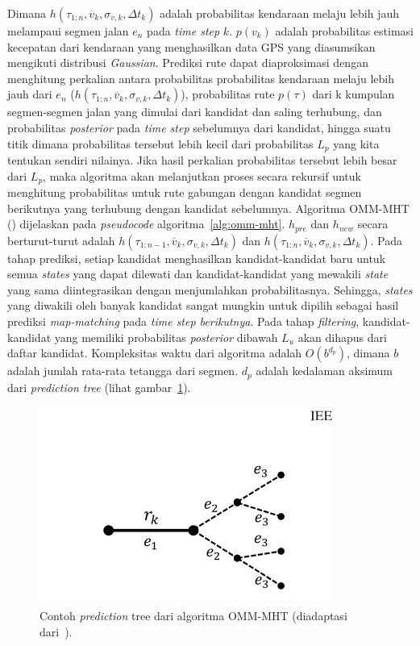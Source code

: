 Dimana $h(\tau_{1:n},\overline{v}_k,\sigma_{v,k},\Delta t_k)$ adalah probabilitas kendaraan melaju lebih jauh melampaui segmen jalan $e_n$ pada \textit{time step } $k$. $p(v_k)$ adalah probabilitas estimasi kecepatan dari kendaraan yang menghasilkan data GPS yang diasumsikan mengikuti distribusi \textit{Gaussian}. Prediksi rute dapat diaproksimasi dengan menghitung perkalian antara probabilitas probabilitas kendaraan melaju lebih jauh dari $e_n$ ($h(\tau_{1:n},\overline{v}_k,\sigma_{v,k},\Delta t_k)$), probabilitas rute $p(\tau)$ dari k kumpulan segmen-segmen jalan yang  dimulai dari kandidat dan saling terhubung, dan probabilitas \textit{posterior} pada \textit{time step} sebelumnya dari kandidat, hingga suatu titik dimana probabilitas tersebut lebih kecil dari probabilitas $L_p$ yang kita tentukan sendiri nilainya. Jika hasil perkalian probabilitas tersebut lebih besar dari $L_p$, maka algoritma akan melanjutkan proses secara rekursif untuk menghitung probabilitas untuk rute gabungan dengan kandidat segmen berikutnya yang terhubung dengan kandidat sebelumnya.  Algoritma OMM-MHT (\cite{Taguchi2019}) dijelaskan pada \textit{pseudocode} algoritma~\ref{alg:omm-mht}. $h_{pre}$ dan $h_{new}$ secara berturut-turut adalah $h(\tau_{1:n-1}, \overline{v}_k,\sigma_{v,k},\Delta t_k)$ dan $h(\tau_{1:n}, \overline{v}_k,\sigma_{v,k},\Delta t_k)$. Pada tahap prediksi, setiap kandidat menghasilkan kandidat-kandidat baru untuk semua \textit{states} yang dapat dilewati dan kandidat-kandidat yang mewakili \textit{state} yang sama diintegrasikan dengan menjumlahkan probabilitasnya. Sehingga, \textit{states} yang diwakili oleh banyak kandidat sangat mungkin untuk dipilih sebagai hasil prediksi \textit{map-matching} pada \textit{time step berikutnya}. Pada tahap \textit{filtering}, kandidat-kandidat yang memiliki probabilitas \textit{posterior} dibawah $L_u$ akan dihapus dari daftar kandidat. Kompleksitas waktu dari algoritma adalah $O(b^{d_p})$, dimana $b$ adalah jumlah rata-rata tetangga dari segmen. $d_p$ adalah kedalaman aksimum dari \textit{prediction tree} (lihat gambar~\ref{fig:prediction-tree-omm}).


\begin{figure}[H]
    \centering
    \includegraphics[]{figures/prediction_tree_omm.png}
    \caption{Contoh \textit{prediction} tree dari algoritma OMM-MHT (diadaptasi dari~\cite{Taguchi2019}).}
    \label{fig:prediction-tree-omm}
\end{figure}




